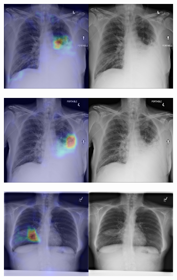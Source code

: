 \begin{figure}[b]
\begin{subfigure}{0.4\textwidth}
    \end{subfigure}
    \begin{subfigure}{0.4\textwidth}
        \centering
        \includegraphics[width=1.0\textwidth]{Chapters/5. Conclusiones/img/Consolidation/1_1_00000467_002.png}
    \end{subfigure}
    \begin{subfigure}{0.4\textwidth}
        \centering
        \includegraphics[width=1.0\textwidth]{Chapters/5. Conclusiones/img/Consolidation/1_1_00000467_003.png}
    \end{subfigure}
    \begin{subfigure}{0.4\textwidth}
        \centering
        \includegraphics[width=1.0\textwidth]{Chapters/5. Conclusiones/img/Consolidation/1_1_00000618_008.png}

\end{subfigure}
\end{figure}

